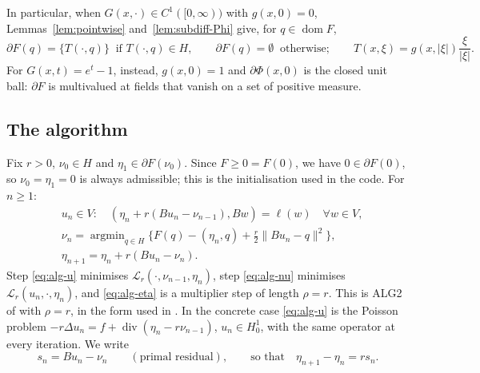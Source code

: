 \documentclass[11pt]{amsart}
\theoremstyle{definition}
\theoremstyle{remark}
\numberwithin{equation}{section}
\newcommand{\Lag}{\mathcal{L}_r}
\newcommand{\abs}[1]{\lvert #1\rvert}
\newcommand{\norm}[1]{\lVert #1\rVert}
\DeclareMathOperator{\dom}{dom}
\DeclareMathOperator{\divg}{div}
\DeclareMathOperator*{\argmin}{argmin}
\begin{document}
In particular, when $G(x,\cdot)\in C^1([0,\infty))$ with $g(x,0)=0$, Lemmas~\ref{lem:pointwise} and~\ref{lem:subdiff-Phi} give, for $q\in\dom F$,
\begin{equation}\label{eq:dF-C1}
\partial F(q)=\{T(\cdot,q)\}\ \text{ if } T(\cdot,q)\in H,\qquad \partial F(q)=\emptyset\ \text{ otherwise};\qquad T(x,\xi)=g(x,\abs\xi)\frac{\xi}{\abs\xi}.
\end{equation}
For $G(x,t)=e^t-1$, instead, $g(x,0)=1$ and $\partial\Phi(x,0)$ is the closed unit ball: $\partial F$ is multivalued at fields that vanish on a set of positive measure.

\subsection{The algorithm}\label{ssec:algorithm}
Fix $r>0$, $\nu_0\in H$ and $\eta_1\in\partial F(\nu_0)$. Since $F\ge0=F(0)$, we have $0\in\partial F(0)$, so $\nu_0=\eta_1=0$ is always admissible; this is the initialisation used in the code. For $n\ge1$:
\begin{align}
&u_n\in V:\quad (\eta_n+r(Bu_n-\nu_{n-1}),Bw)=\ell(w)\quad\forall w\in V,\label{eq:alg-u}\\
&\nu_n=\argmin_{q\in H}\Big\{F(q)-(\eta_n,q)+\frac r2\norm{Bu_n-q}^2\Big\},\label{eq:alg-nu}\\
&\eta_{n+1}=\eta_n+r(Bu_n-\nu_n).\label{eq:alg-eta}
\end{align}
Step \eqref{eq:alg-u} minimises $\Lag(\cdot,\nu_{n-1},\eta_n)$, step \eqref{eq:alg-nu} minimises $\Lag(u_n,\cdot,\eta_n)$, and \eqref{eq:alg-eta} is a multiplier step of length $\rho=r$. This is ALG2 of \cite{FortinGlowinski1983ChIII,Glowinski1984ChVI} with $\rho=r$, in the form used in \cite{AragonFBRubio2023}. In the concrete case \eqref{eq:alg-u} is the Poisson problem $-r\Delta u_n=f+\divg(\eta_n-r\nu_{n-1})$, $u_n\in H^1_0$, with the same operator at every iteration. We write
\[
s_n=Bu_n-\nu_n\qquad(\text{primal residual}),\qquad\text{so that}\quad \eta_{n+1}-\eta_n=rs_n .
\]
\end{document}
